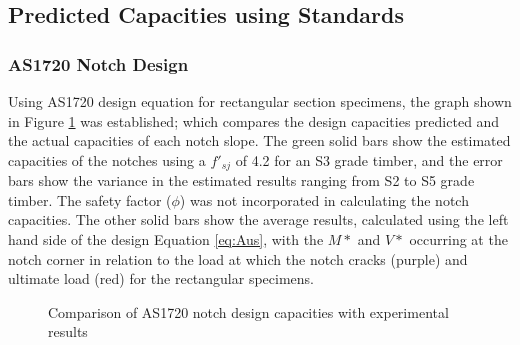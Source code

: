 \documentclass[11pt,a4paper]{article}
\numberwithin{equation}{subsection}
\begin{document}
\subsection{Predicted Capacities using Standards}

\subsubsection{AS1720 Notch Design}
Using AS1720 design equation for rectangular section specimens, the graph shown in Figure \ref{fig:AS_notch} was established; which compares the design capacities predicted and the actual capacities of each notch slope. The green solid bars show the estimated capacities of the notches using a $f'_{sj}$ of 4.2 for an S3 grade timber, and the error bars show the variance in the estimated results ranging from S2 to S5 grade timber. The safety factor ($\phi$) was not incorporated in calculating the notch capacities. The other solid bars show the average results, calculated using the left hand side of the design Equation \ref{eq:Aus}, with the $M*$ and $V*$ occurring at the notch corner in relation to the load at which the notch cracks (purple) and ultimate load (red) for the rectangular specimens.

\begin{figure}[h]
	\begin{center}
	\end{center}
	\caption{Comparison of AS1720 notch design capacities with experimental results}
	\label{fig:AS_notch}
\end{figure}
\end{document}
